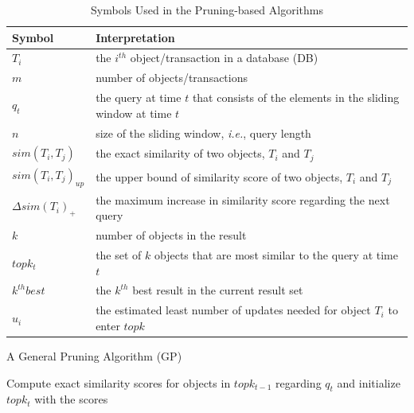 \begin{table}[tb]
\centering
\caption{Symbols Used in the Pruning-based Algorithms}
\begin{tabular}{|l|p{11cm}|} \hline
      Symbol & Interpretation \\ \hline
      $T_i$ & the $i^{th}$ object/transaction in a database (DB)\\ \hline
      $m$ & number of objects/transactions \\ \hline
      $q_t$ & the query at time $t$ that consists of the elements in the sliding window at time $t$ \\ \hline
      $n$ & size of the sliding window, \emph{i.e.}, query length\\ \hline
      $sim(T_i,T_j)$ & the exact similarity of two objects, $T_i$ and $T_j$\\ \hline
      $sim(T_i, T_j)_{up}$ & the upper bound of similarity score of two objects, $T_i$ and $T_j$\\ \hline
      $\Delta sim(T_i)_{+}$ & the maximum increase in similarity score regarding the next query\\ \hline 
      $k$ & number of objects in the result \\ \hline
      $topk_{t}$ & the set of $k$ objects that are most similar to the query at time $t$\\ \hline
      $k^{th}best$ & the $k^{th}$ best result in the current result set\\ \hline
      $u_i$ & the estimated least number of updates needed for object $T_i$ to enter $topk$ \\ \hline
\end{tabular}
  \label{Symbols}
\end{table}

\begin{algorithm2e}[htb]
\SetAlgoLined%
 \caption{A General Pruning Algorithm (GP)}
 \label{GPmain}

 Compute exact similarity scores for objects in $topk_{t-1}$ regarding $q_t$ and initialize $topk_t$ with the scores\;
\end{algorithm2e}

